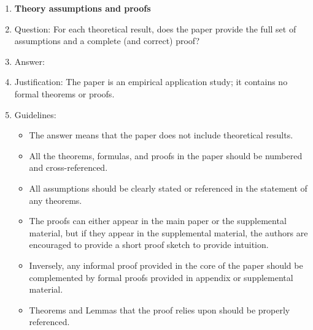 \begin{enumerate}
\begin{itemize}
        \item If applicable, the authors should discuss possible limitations of their approach to address problems of privacy and fairness.
        \item While the authors might fear that complete honesty about limitations might be used by reviewers as grounds for rejection, a worse outcome might be that reviewers discover limitations that aren't acknowledged in the paper. The authors should use their best judgment and recognize that individual actions in favor of transparency play an important role in developing norms that preserve the integrity of the community. Reviewers will be specifically instructed to not penalize honesty concerning limitations.
    \end{itemize}

\item {\bf Theory assumptions and proofs}
    \item[] Question: For each theoretical result, does the paper provide the full set of assumptions and a complete (and correct) proof?
    \item[] Answer: \answerNA{}
    \item[] Justification: The paper is an empirical application study; it contains no formal theorems or proofs.
    \item[] Guidelines:
    \begin{itemize}
        \item The answer \answerNA{} means that the paper does not include theoretical results.
        \item All the theorems, formulas, and proofs in the paper should be numbered and cross-referenced.
        \item All assumptions should be clearly stated or referenced in the statement of any theorems.
        \item The proofs can either appear in the main paper or the supplemental material, but if they appear in the supplemental material, the authors are encouraged to provide a short proof sketch to provide intuition.
        \item Inversely, any informal proof provided in the core of the paper should be complemented by formal proofs provided in appendix or supplemental material.
        \item Theorems and Lemmas that the proof relies upon should be properly referenced.
    \end{itemize}


\end{enumerate}
